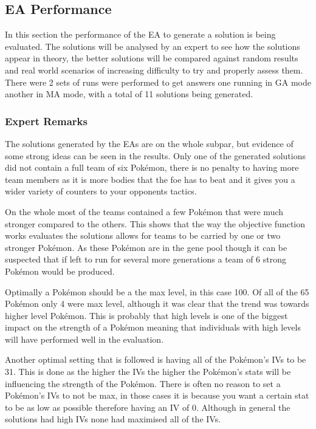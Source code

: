 \documentclass[a4paper]{article}
\newcommand{\Pokemon}{Pok\'{e}mon}
\begin{document}
\subsection{EA Performance}
In this section the performance of the EA to generate a solution is being evaluated.
The solutions will be analysed by an expert to see how the solutions appear in theory, the better solutions will be compared against random results and real world scenarios of increasing difficulty to try and properly assess them.
There were 2 sets of runs were performed to get answers one running in GA mode another in MA mode, with a total of 11 solutions being generated.
\subsubsection{Expert Remarks}
The solutions generated by the EAs are on the whole subpar, but evidence of some strong ideas can be seen in the results.
Only one of the generated solutions did not contain a full team of six \Pokemon{}, there is no penalty to having more team members as it is more bodies that the foe has to beat and it gives you a wider variety of counters to your opponents tactics.
\par
On the whole most of the teams contained a few \Pokemon{} that were much stronger compared to the others.
This shows that the way the objective function works evaluates the solutions allows for teams to be carried by one or two stronger \Pokemon{}.
As these \Pokemon{} are in the gene pool though it can be suspected that if left to run for several more generations a team of 6 strong \Pokemon{} would be produced.
\par
Optimally a \Pokemon{} should be a the max level, in this case 100.
Of all of the 65 \Pokemon{} only 4 were max level, although it was clear that the trend was towards higher level \Pokemon{}.
This is probably that high levels is one of the biggest impact on the strength of a \Pokemon{} meaning that individuals with high levels will have performed well in the evaluation.
\par
Another optimal setting that is followed is having all of the \Pokemon{}'s IVs to be 31.
This is done as the higher the IVs the higher the \Pokemon{}'s stats will be influencing the strength of the \Pokemon{}.
There is often no reason to set a \Pokemon{}'s IVs to not be max, in those cases it is because you want a certain stat to be as low as possible therefore having an IV of 0.
Although in general the solutions had high IVs none had maximised all of the IVs.
\end{document}
